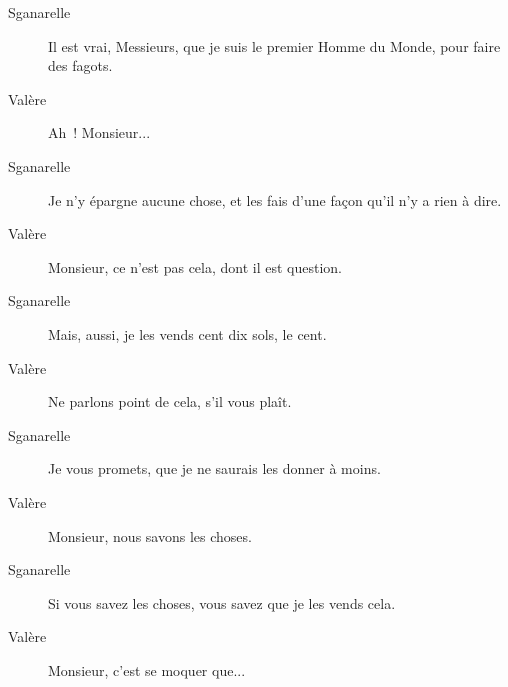 \documentclass[french,twoside]{book} %
\begin{document}
 \begin{description} \item[Sganarelle] 

Il est vrai, Messieurs, que je suis le premier Homme du Monde, pour faire des fagots.\end{description}
 \begin{description} \item[Valère] 

Ah ! Monsieur...\end{description}
 \begin{description} \item[Sganarelle] 

Je n’y épargne aucune chose, et les fais d’une façon qu’il n’y a rien à dire.\end{description}
 \begin{description} \item[Valère] 

Monsieur, ce n’est pas cela, dont il est question.\end{description}
 \begin{description} \item[Sganarelle] 

Mais, aussi, je les vends cent dix sols, le cent.\end{description}
 \begin{description} \item[Valère] 

Ne parlons point de cela, s’il vous plaît.\end{description}
 \begin{description} \item[Sganarelle] 

Je vous promets, que je ne saurais les donner à moins.\end{description}
 \begin{description} \item[Valère] 

Monsieur, nous savons les choses.\end{description}
 \begin{description} \item[Sganarelle] 

Si vous savez les choses, vous savez que je les vends cela.\end{description}
 \begin{description} \item[Valère] 

Monsieur, c’est se moquer que...\end{description}
\end{document}
